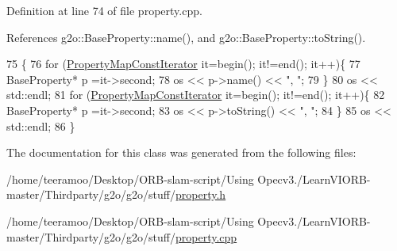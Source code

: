 Definition at line 74 of file property.\+cpp.



References g2o\+::\+Base\+Property\+::name(), and g2o\+::\+Base\+Property\+::to\+String().


\begin{DoxyCode}
75   \{
76     \textcolor{keywordflow}{for} (\hyperlink{classg2o_1_1PropertyMap_af09ea140ab099b1762e9634b7fdcaf52}{PropertyMapConstIterator} it=begin(); it!=end(); it++)\{
77       BaseProperty* p =it->second;
78       os << p->name() << \textcolor{stringliteral}{", "};
79     \}
80     os << std::endl;
81     \textcolor{keywordflow}{for} (\hyperlink{classg2o_1_1PropertyMap_af09ea140ab099b1762e9634b7fdcaf52}{PropertyMapConstIterator} it=begin(); it!=end(); it++)\{
82       BaseProperty* p =it->second;
83       os << p->toString() << \textcolor{stringliteral}{", "};
84     \}
85     os << std::endl;
86   \}
\end{DoxyCode}


The documentation for this class was generated from the following files\+:\begin{DoxyCompactItemize}
\item 
/home/teeramoo/\+Desktop/\+O\+R\+B-\/slam-\/script/\+Using Opecv3./\+Learn\+V\+I\+O\+R\+B-\/master/\+Thirdparty/g2o/g2o/stuff/\hyperlink{property_8h}{property.\+h}\item 
/home/teeramoo/\+Desktop/\+O\+R\+B-\/slam-\/script/\+Using Opecv3./\+Learn\+V\+I\+O\+R\+B-\/master/\+Thirdparty/g2o/g2o/stuff/\hyperlink{property_8cpp}{property.\+cpp}\end{DoxyCompactItemize}

